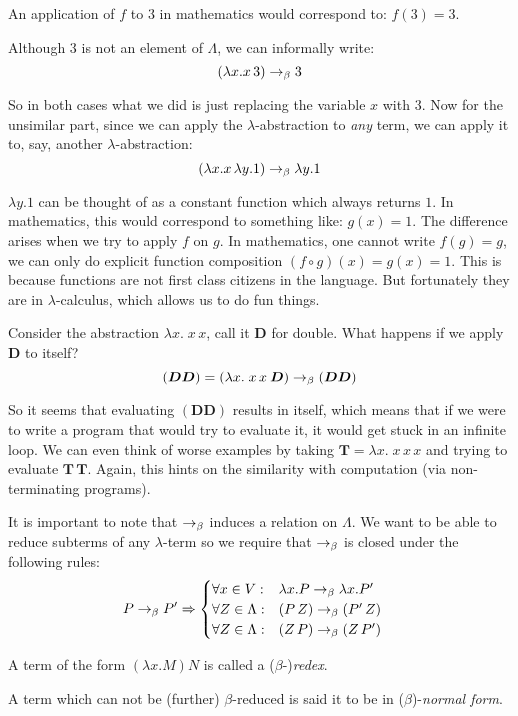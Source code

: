 An application of $f$ to $3$ in mathematics would correspond to: $f(3) = 3$.

Although $3$ is not an element of $\Lambda$, we can informally write:
    \[ (\lambda x. x\, 3) \rightarrow_\beta 3 \]

So in both cases what we did is just replacing the variable $x$ with $3$. Now
for the unsimilar part, since we can apply the $\lambda$-abstraction to
\emph{any} term, we can apply it to, say, another $\lambda$-abstraction:
    \[ (\lambda x. x\, \lambda y. 1) \rightarrow_\beta \lambda y. 1 \]

$\lambda y. 1$ can be thought of as a constant function which always returns
$1$.  In mathematics, this would correspond to something like: $g(x) = 1$.  The
difference arises when we try to apply $f$ on $g$. In mathematics, one cannot
write $f(g) = g$, we can only do explicit function composition $(f \circ g)(x) =
g(x) = 1$. This is because functions are not first class citizens in the
language. But fortunately they are in $\lambda$-calculus, which allows us to do
fun things.

Consider the abstraction $\lambda x.\; x\, x$, call it $\bm{D}$ for double.
What happens if we apply $\bm{D}$ to itself?
    \[ (\bm{D} \bm{D}) = (\lambda x.\; x\, x\: \bm{D})
        \rightarrow_\beta (\bm{D} \bm{D}) \]

So it seems that evaluating $(\bm{D} \bm{D})$ results in itself, which means
that if we were to write a program that would try to evaluate it, it would get
stuck in an infinite loop. We can even think of worse examples by taking
$\bm{T} = \lambda x.\; x\, x\,x$ and trying to evaluate $\bm{T}\, \bm{T}$.
Again, this hints on the similarity with computation (via non-terminating
programs).

It is important to note that $\rightarrow_\beta$ induces a relation on $\Lambda$. We
want to be able to reduce subterms of any $\lambda$-term so we require that
$\rightarrow_\beta$ is closed under the following rules:
\begin{align*}
    P \rightarrow_\beta P' &\Rightarrow
        \begin{cases}
            \forall x \in V: & \lambda x.P \rightarrow_\beta \lambda x. P' \\
            \forall Z \in \Lambda: & (P\, Z) \rightarrow_\beta (P'\, Z) \\
            \forall Z \in \Lambda: & (Z\, P) \rightarrow_\beta (Z\, P')
        \end{cases}
\end{align*}

\begin{definition}
    A term of the form $(\lambda x. M) N$ is called a ($\beta$-)\emph{redex}.
\end{definition}
\begin{definition}
    A term which can not be (further) $\beta$-reduced is said it to be in
    ($\beta$)-\emph{normal form}.
\end{definition}

